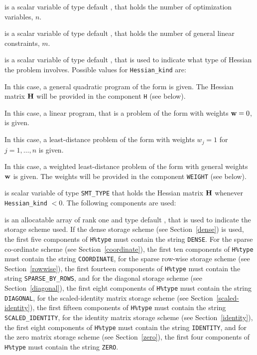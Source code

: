 \documentclass{galahad}
\begin{document}
\begin{description}

 is a scalar variable of type default \integer,
 that holds the number of optimization variables, $n$.

 is a scalar variable of type default \integer,
 that holds the number of general linear constraints, $m$.

 is a scalar variable of type default \integer,
that is used to indicate what type of Hessian the problem involves.
Possible values for {\tt Hessian\_kind} are:

\begin{description}
  In this case, a general quadratic program of the form
 is given. The Hessian matrix ${\mathbf{H}}$ will be provided in the
component {\tt H} (see below).

  In this case, a linear program, that is a problem of the form
 with weights ${\mathbf{w}} = 0$, is given.

 In this case, a least-distance problem of the form 
with weights $w_{j} = 1$ for $j = 1, \ldots , n$ is given.

 In this case, a weighted least-distance problem of the form 
with general weights ${\mathbf{w}}$ is given. The weights will be
provided in the component {\tt WEIGHT} (see below).
\end{description}

 is scalar variable of type {\tt SMT\_TYPE}
that holds the Hessian matrix ${\mathbf{H}}$ whenever {\tt Hessian\_kind} $<0$.
The following components are used:

\begin{description}

 is an allocatable array of rank one and type default \character,
that is used to indicate the storage scheme used. If the dense storage scheme
(see Section~\ref{dense}) is used,
the first five components of {\tt H\%type} must contain the
string {\tt DENSE}.
For the sparse co-ordinate scheme (see Section~\ref{coordinate}),
the first ten components of {\tt H\%type} must contain the
string {\tt COORDINATE},
for the sparse row-wise storage scheme (see Section~\ref{rowwise}),
the first fourteen components of {\tt H\%type} must contain the
string {\tt SPARSE\_BY\_ROWS},
and for the diagonal storage scheme (see Section~\ref{diagonal}),
the first eight components of {\tt H\%type} must contain the
string {\tt DIAGONAL},
for the scaled-identity matrix storage scheme
(see Section~\ref{scaled-identity}),
the first fifteen components of {\tt H\%type} must contain the
string {\tt SCALED\_IDENTITY},
for the identity matrix storage scheme
(see Section~\ref{identity}),
the first eight components of {\tt H\%type} must contain the
string {\tt IDENTITY}, and
for the zero matrix storage scheme
(see Section~\ref{zero}),
the first four components of {\tt H\%type} must contain the
string {\tt ZERO}.


\end{description}
\end{description}
\end{document}
